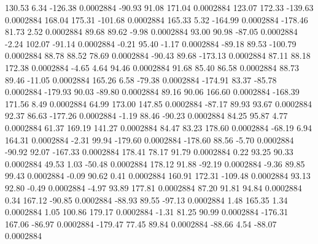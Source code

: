       130.53        6.34     -126.38     0.0002884
      -90.93       91.08      171.04     0.0002884
      123.07      172.33     -139.63     0.0002884
      168.04      175.31     -101.68     0.0002884
      165.33        5.32     -164.99     0.0002884
     -178.46       81.73        2.52     0.0002884
       89.68       89.62       -9.98     0.0002884
       93.00       90.98      -87.05     0.0002884
       -2.24      102.07      -91.14     0.0002884
       -0.21       95.40       -1.17     0.0002884
      -89.18       89.53     -100.79     0.0002884
       88.78       88.52       78.69     0.0002884
      -90.43       89.68     -173.13     0.0002884
       87.11       88.18      172.38     0.0002884
       -4.65        4.64       94.46     0.0002884
       91.68       85.40       86.58     0.0002884
       88.73       89.46      -11.05     0.0002884
      165.26        6.58      -79.38     0.0002884
     -174.91       83.37      -85.78     0.0002884
     -179.93       90.03      -89.80     0.0002884
       89.16       90.06      166.60     0.0002884
     -168.39      171.56        8.49     0.0002884
       64.99      173.00      147.85     0.0002884
      -87.17       89.93       93.67     0.0002884
       92.37       86.63     -177.26     0.0002884
       -1.19       88.46      -90.23     0.0002884
       84.25       95.87        4.77     0.0002884
       61.37      169.19      141.27     0.0002884
       84.47       83.23      178.60     0.0002884
      -68.19        6.94      164.31     0.0002884
       -2.31       99.94     -179.60     0.0002884
     -178.60       88.56       -5.70     0.0002884
      -90.92       92.07     -167.33     0.0002884
      178.41       78.17       91.79     0.0002884
        0.22       93.25       90.33     0.0002884
       49.53        1.03      -50.48     0.0002884
      178.12       91.88      -92.19     0.0002884
       -9.36       89.85       99.43     0.0002884
       -0.09       90.62        0.41     0.0002884
      160.91      172.31     -109.48     0.0002884
       93.13       92.80       -0.49     0.0002884
       -4.97       93.89      177.81     0.0002884
       87.20       91.81       94.84     0.0002884
        0.34      167.12      -90.85     0.0002884
      -88.93       89.55      -97.13     0.0002884
        1.48      165.35        1.34     0.0002884
        1.05      100.86      179.17     0.0002884
       -1.31       81.25       90.99     0.0002884
     -176.31      167.06      -86.97     0.0002884
     -179.47       77.45       89.84     0.0002884
      -88.66        4.54      -88.07     0.0002884
